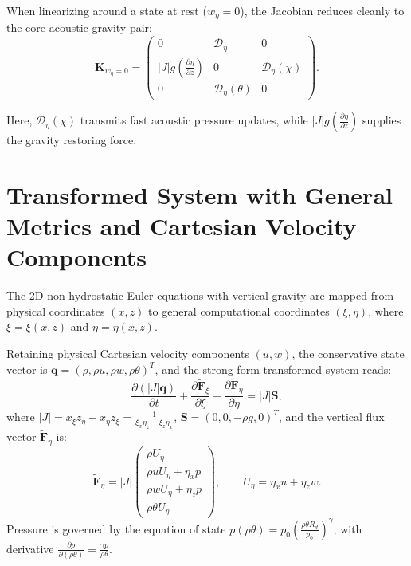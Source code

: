\documentclass[11pt,a4paper]{article}
\begin{document}
	When linearizing around a state at rest ($w_\eta = 0$), the Jacobian reduces cleanly to the core acoustic-gravity pair:
	\begin{equation}
		\mathbf{K}_{w_\eta=0} = \begin{pmatrix}
			0 & \mathcal{D}_\eta & 0 \\[6pt]
			|J| g \left(\frac{\partial \eta}{\partial z}\right) & 0 & \mathcal{D}_\eta \left( \chi \right) \\[6pt]
			0 & \mathcal{D}_\eta \left( \theta \right) & 0
		\end{pmatrix}.
	\end{equation}
	
	Here, $\mathcal{D}_\eta (\chi)$ transmits fast acoustic pressure updates, while $|J| g \left(\frac{\partial \eta}{\partial z}\right)$ supplies the gravity restoring force.
	

	
	\section{Transformed System with General Metrics and Cartesian Velocity Components}
	
	The 2D non-hydrostatic Euler equations with vertical gravity are mapped from physical coordinates $(x, z)$ to general computational coordinates $(\xi, \eta)$, where $\xi = \xi(x,z)$ and $\eta = \eta(x,z)$. 
	
	Retaining physical Cartesian velocity components $(u, w)$, the conservative state vector is $\boldsymbol{q} = (\rho, \rho u, \rho w, \rho \theta)^T$, and the strong-form transformed system reads:
	\begin{equation}
		\frac{\partial (|J| \boldsymbol{q})}{\partial t} + \frac{\partial \widetilde{\mathbf{F}}_\xi}{\partial \xi} + \frac{\partial \widetilde{\mathbf{F}}_\eta}{\partial \eta} = |J| \boldsymbol{S},
	\end{equation}
	where $|J| = x_\xi z_\eta - x_\eta z_\xi = \frac{1}{\xi_x \eta_z - \xi_z \eta_x}$, $\boldsymbol{S} = (0, 0, -\rho g, 0)^T$, and the vertical flux vector $\widetilde{\mathbf{F}}_\eta$ is:
	\begin{equation}
		\widetilde{\mathbf{F}}_\eta = |J| \begin{pmatrix} \rho U_\eta \\[2pt] \rho u U_\eta + \eta_x p \\[2pt] \rho w U_\eta + \eta_z p \\[2pt] \rho \theta U_\eta \end{pmatrix}, \qquad U_\eta = \eta_x u + \eta_z w.
	\end{equation}
	Pressure is governed by the equation of state $p(\rho\theta) = p_0 \left( \frac{\rho\theta R_d}{p_0} \right)^\gamma$, with derivative $\frac{\partial p}{\partial (\rho\theta)} = \frac{\gamma p}{\rho\theta}$.
	
\end{document}
